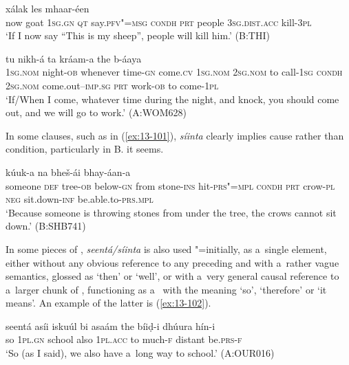\begin{exe}
\ex
\label{ex:13-99}
  xálak les mhaar-éen \\
now goat \textsc{1sg.gn} \textsc{qt} say.\textsc{pfv"=msg} \textsc{condh} \textsc{prt} people \textsc{3sg.dist.acc} kill-\textsc{3pl} \\
\glt `If I now say ``This is my sheep'', people will kill him.' (B:THI)

\ex
\label{ex:13-100}
 tu
nikh-á  ta kráam-a the b-áaya \\
\textsc{1sg.nom} night-\textsc{ob} whenever time-\textsc{gn} come.\textsc{cv} \textsc{1sg.nom}  \textsc{2sg.nom} to call-\textsc{1sg} \textsc{condh} \textsc{2sg.nom} come.out--\textsc{imp.sg}  \textsc{prt} work-\textsc{ob} to come-\textsc{1pl} \\
\glt `If/When I come, whatever time during the night, and knock, you should come out, and we will go to work.' (A:WOM628) 
\end{exe}

In some clauses, such as in (\ref{ex:13-101}), \textit{síinta} clearly implies cause rather than condition, particularly in B. it seems.

\begin{exe}
\ex
\label{ex:13-101}
 kúuk-a
na bheš-ái  bhay-áan-a \\
someone \textsc{def} tree-\textsc{ob} below-\textsc{gn} from stone-\textsc{ins}  hit-\textsc{prs"=mpl} \textsc{condh} \textsc{prt} crow-\textsc{pl} \textsc{neg} sit.down-\textsc{inf} be.able.to-\textsc{prs.mpl} \\
\glt `Because someone is throwing stones from under the tree, the crows cannot sit down.' (B:SHB741) 
\end{exe}

In some pieces of , \textit{seentá/síinta} is also used "=initially, as a~single element, either without any obvious reference to any preceding  and with a~rather vague semantics, glossed as `then' or `well', or with a~very general causal reference to a~larger chunk of , functioning as a~ with the meaning `so', `therefore' or `it means'. An example of the latter is (\ref{ex:13-102}).

\begin{exe}
\ex
\label{ex:13-102}
\gll seentá asíi iskuúl bi asaám the bíiḍ-i dhúura  hín-i \\
so \textsc{1pl.gn} school also \textsc{1pl.acc} to much-\textsc{f} distant be.\textsc{prs-f} \\
\glt `So (as I said), we also have a~long way to school.' (A:OUR016) 
\end{exe}

